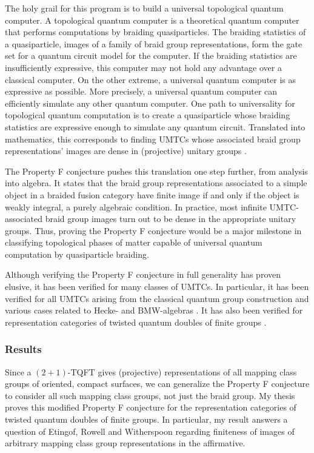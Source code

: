 \documentclass[12pt]{article}
\theoremstyle{plain} \numberwithin{equation}{section}
\theoremstyle{definition}
\begin{document}
The holy grail for this program is to build a universal topological quantum computer.  A topological quantum computer is a theoretical quantum computer that performs computations by braiding quasiparticles. The braiding statistics of a quasiparticle, images of a family of braid group representations, form the gate set for a quantum circuit model for the computer. If the braiding statistics are insufficiently expressive, this computer may not hold any advantage over a classical computer. On the other extreme, a universal quantum computer is as expressive as possible. More precisely, a universal quantum computer can efficiently simulate any other quantum computer.  One path to universality for topological quantum computation is to create a quasiparticle whose braiding statistics are expressive enough to simulate any quantum circuit.  Translated into mathematics, this corresponds to finding UMTCs whose associated braid group representations' images are dense in (projective) unitary groups \cite{flw}.

The Property F conjecture \cite{nr} pushes this translation one step further, from analysis into algebra.  It states that the braid group representations associated to a simple object in a braided fusion category have finite image if and only if the object is weakly integral, a purely algebraic condition.  In practice, most infinite UMTC-associated braid group images turn out to be dense in the appropriate unitary groups.  Thus, proving the Property F conjecture would be a major milestone in classifying topological phases of matter capable of universal quantum computation by quasiparticle braiding.

Although verifying the Property F conjecture in full generality has proven elusive, it has been verified for many classes of UMTCs.  In particular, it has been verified for all UMTCs arising from the classical quantum group construction and various cases related to Hecke- and BMW-algebras \cite{FRW, flw, jones86, jonescmp, LRW, r, rw}.  It has also been verified for representation categories of twisted quantum doubles of finite groups \cite{erw}.

\subsubsection*{Results}

Since a $(2+1)$-TQFT gives (projective) representations of all mapping class groups of oriented, compact surfaces, we can generalize the Property F conjecture to consider all such mapping class groups, not just the braid group. My thesis proves this modified Property F conjecture for the representation categories of twisted quantum doubles of finite groups.  In particular, my result answers a question of Etingof, Rowell and Witherspoon \cite{erw} regarding finiteness of images of arbitrary mapping class group representations in the affirmative.
\end{document}
